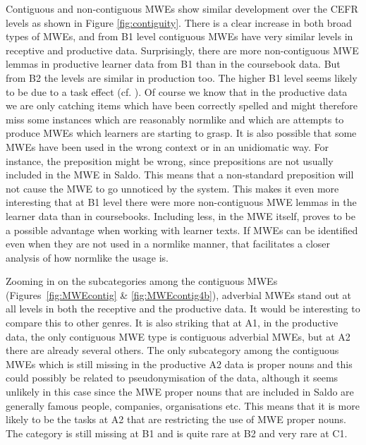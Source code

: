 \documentclass[output=paper,colorlinks,citecolor=brown]{langscibook}
\begin{document}
Contiguous and non-contiguous MWEs show similar development over the CEFR levels as shown in Figure \ref{fig:contiguity}. There is a clear increase in both broad types of MWEs, and from B1 level contiguous MWEs have very similar levels in receptive and productive data. Surprisingly, there are more non-contiguous MWE lemmas in productive learner data from B1 than in the coursebook data. But from B2 the levels are similar in production too. The higher B1 level seems likely to be due to a task effect (cf. \citealt{caines2017effect}).  Of course we know that in the productive data we are only catching items which have been correctly spelled and might therefore miss some instances which are reasonably normlike and which are attempts to produce MWEs which learners are starting to grasp. It is also possible that some MWEs have been used in the wrong context or in an unidiomatic way. For instance, the preposition might be wrong, since prepositions are not usually included in the MWE in Saldo. This means that a non-standard preposition will not cause the MWE to go unnoticed by the system. This makes it even more interesting that at B1 level there were more non-contiguous MWE lemmas in the learner data than in coursebooks. Including less, in the MWE itself, proves to be a possible advantage when working with learner texts. If MWEs can be identified even when they are not used in a normlike manner, that facilitates a closer analysis of how normlike the usage is. 

Zooming in on the subcategories among the contiguous MWEs (Figures~\ref{fig:MWEcontig} \& \ref{fig:MWEcontig4b}), adverbial MWEs stand out at all levels in both the receptive and the productive data. It would be interesting to compare this to other genres. It is also striking that at A1, in the productive data, 
the only contiguous MWE type is contiguous adverbial MWEs, but at A2 there are already several others. The only subcategory among the contiguous MWEs which is still missing in the productive A2 data is proper nouns and this could possibly be related to pseudonymisation of the data, although it seems unlikely in this case since the MWE proper nouns that are included in Saldo are generally famous people, companies, organisations etc. This means that it is more likely to be the tasks at A2 that are restricting the use of MWE proper nouns. The category is still missing at B1 and is quite rare at B2 and very rare at C1.
\end{document}
